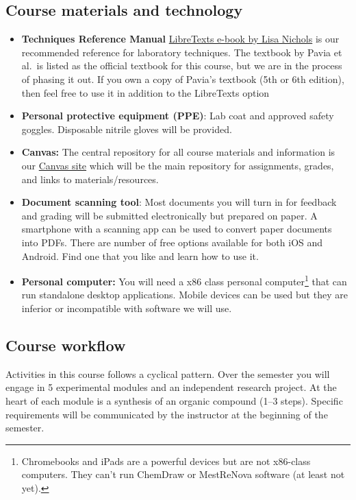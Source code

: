 \subsection{Course materials and
technology}\label{course-materials-and-technology}

\begin{itemize}
\tightlist
\item
  \textbf{Techniques Reference Manual}
  \href{https://chem.libretexts.org/Bookshelves/Organic_Chemistry/Book:_Organic_Chemistry_Lab_Techniques_(Nichols)}{LibreTexts
  e-book by Lisa Nichols} is our recommended reference for laboratory
  techniques. The textbook by Pavia et al.~is listed as the official
  textbook for this course, but we are in the process of phasing it out.
  If you own a copy of Pavia's textbook (5th or 6th edition), then feel
  free to use it in addition to the LibreTexts option
\item
  \textbf{Personal protective equipment (PPE)}: Lab coat and approved
  safety goggles. Disposable nitrile gloves will be provided.
\item
  \textbf{Canvas:} The central repository for all course materials and
  information is our
  \href{https://fresnostate.instructure.com/courses/76128}{Canvas site}
  which will be the main repository for assignments, grades, and links
  to materials/resources.
\item
  \textbf{Document scanning tool}: Most documents you will turn in for
  feedback and grading will be submitted electronically but prepared on
  paper. A smartphone with a scanning app can be used to convert paper
  documents into PDFs. There are number of free options available for
  both iOS and Android. Find one that you like and learn how to use it.
\item
  \textbf{Personal computer:} You will need a x86 class personal
  computer\footnote{Chromebooks and iPads are a powerful devices but are
    not x86-class computers. They can't run ChemDraw or MestReNova
    software (at least not yet).} that can run standalone desktop
  applications. Mobile devices can be used but they are inferior or
  incompatible with software we will use.
\end{itemize}

\subsection{Course workflow}\label{course-workflow}

Activities in this course follows a cyclical pattern. Over the semester
you will engage in 5 experimental modules and an independent research
project. At the heart of each module is a synthesis of an organic
compound (1--3 steps). Specific requirements will be communicated by the
instructor at the beginning of the semester.

